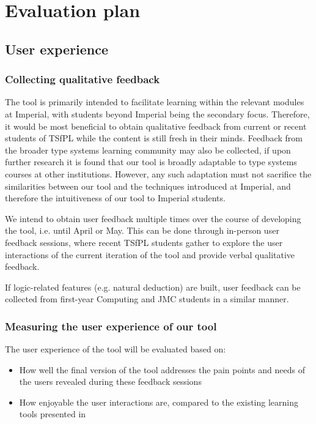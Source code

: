 \chapter{Evaluation plan}
\section{User experience}
\subsection{Collecting qualitative feedback}
The tool is primarily intended to facilitate learning within the relevant modules at Imperial, with students beyond Imperial being the secondary focus. Therefore, it would be most beneficial to obtain qualitative feedback from current or recent students of TSfPL while the content is still fresh in their minds. Feedback from the broader type systems learning community may also be collected, if upon further research it is found that our tool is broadly adaptable to type systems courses at other institutions. However, any such adaptation must not sacrifice the similarities between our tool and the techniques introduced at Imperial, and therefore the intuitiveness of our tool to Imperial students.

We intend to obtain user feedback multiple times over the course of developing the tool, i.e. until April or May. This can be done through in-person user feedback sessions, where recent TSfPL students gather to explore the user interactions of the current iteration of the tool and provide verbal qualitative feedback.

If logic-related features (e.g. natural deduction) are built, user feedback can be collected from first-year Computing and JMC students in a similar manner.

\subsection{Measuring the user experience of our tool}
The user experience of the tool will be evaluated based on:
\begin{itemize}
    \item How well the final version of the tool addresses the pain points and needs of the users revealed during these feedback sessions
    \item How enjoyable the user interactions are, compared to the existing learning tools presented in 
\end{itemize}


